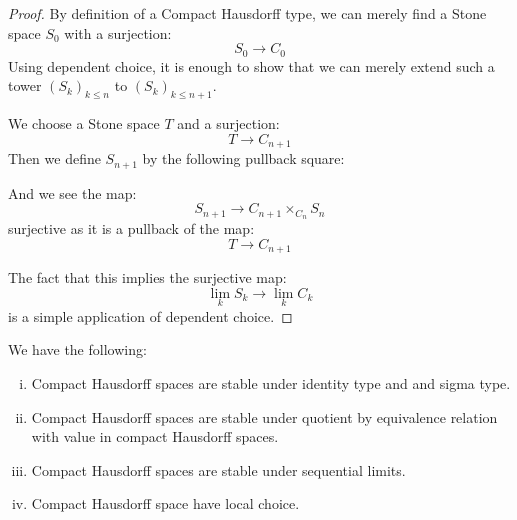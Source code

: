 \begin{proof}
By definition of a Compact Hausdorff type, we can merely find a Stone space $S_0$ with a surjection:
\[S_0\to C_0\]
Using dependent choice, it is enough to show that we can merely extend such a tower $(S_k)_{k\leq n}$ to $(S_k)_{k\leq n+1}$.

We choose a Stone space $T$ and a surjection:
\[T \to C_{n+1} \]
Then we define $S_{n+1}$ by the following pullback square:
\begin{center}
\end{center}
And we see the map:
\[S_{n+1} \to C_{n+1}\times_{C_n} S_n\] 
surjective as it is a pullback of the map:
\[T\to C_{n+1}\]

The fact that this implies the surjective map:
\[\lim_kS_k \to \lim_k C_k\]
is a simple application of dependent choice.
\end{proof}

\begin{theorem}
We have the following:
\begin{enumerate}[(i)]
\item Compact Hausdorff spaces are stable under identity type and and sigma type.
\item Compact Hausdorff spaces are stable under quotient by equivalence relation with value in compact Hausdorff spaces.
\item Compact Hausdorff spaces are stable under sequential limits.
\item Compact Hausdorff space have local choice.
\end{enumerate}
\end{theorem}

